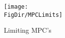 \begin{figure}
\centerline{\texttt{[image: \\FigDir/MPCLimits]}}
\caption{Limiting MPC's}
\label{fig:mpclimits}
\end{figure}
